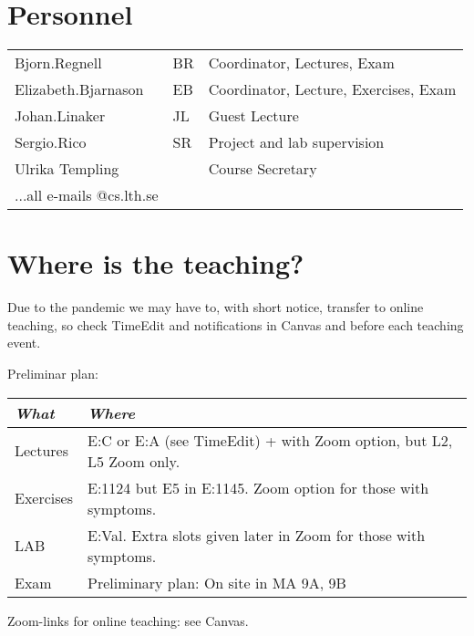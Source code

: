 \section{Personnel}
\begin{flushleft}
	\setlength{\tabcolsep}{0pt}
	\begin{tabular}{p{} p{} p{}}
		Bjorn.Regnell & BR & Coordinator, Lectures, Exam \\
		Elizabeth.Bjarnason & EB & Coordinator, Lecture, Exercises, Exam \\
		Johan.Linaker & JL & Guest Lecture \\
		Sergio.Rico & SR & Project and lab supervision \\
		Ulrika Templing & & Course Secretary \\
		...all e-mails @cs.lth.se
	\end{tabular}
\end{flushleft}

\section{Where is the teaching?}
Due to the pandemic we may have to, with short notice, transfer to online teaching, so check TimeEdit and notifications in Canvas and before each teaching event.

\vspace{1em}
\noindent Preliminar plan:
\begin{flushleft}
\small
\begin{tabular}{l | l } 
{\it What} & {\it Where} \\
\hline
Lectures & E:C or E:A (see TimeEdit) + with Zoom option, but L2, L5 Zoom only. \\
Exercises & E:1124 but E5 in E:1145. Zoom option for those with symptoms. \\
LAB& E:Val. Extra slots given later in Zoom for those with symptoms.\\
Exam & Preliminary plan: On site in MA 9A, 9B \\
\end{tabular}
\end{flushleft}

Zoom-links for online teaching: see Canvas. 